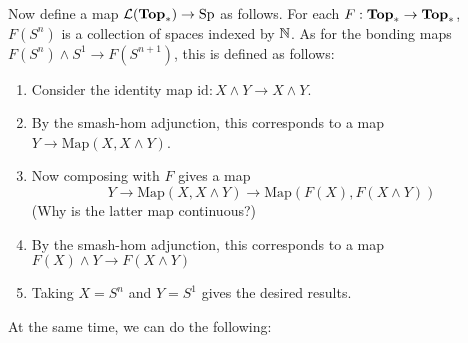 \documentclass[a4paper]{article}
\begin{document}
Now define a map $\mathcal{L}(\bold{Top}_\ast)\to\text{Sp}$ as follows. For each $F:\bold{Top}_\ast\to\bold{Top}_\ast$, $F(S^n)$ is a collection of spaces indexed by $\mathbb{N}$. As for the bonding maps $F(S^n)\wedge S^1\to F(S^{n+1})$, this is defined as follows: 
\begin{enumerate}
\item Consider the identity map $\text{id}:X\wedge Y\to X\wedge Y$. 
\item By the smash-hom adjunction, this corresponds to a map $Y\to\text{Map}(X,X\wedge Y)$. 
\item Now composing with $F$ gives a map $$Y\to\text{Map}(X,X\wedge Y)\to\text{Map}(F(X),F(X\wedge Y))$$ (Why is the latter map continuous?)
\item By the smash-hom adjunction, this corresponds to a map $F(X)\wedge Y\to F(X\wedge Y)$
\item Taking $X=S^n$ and $Y=S^1$ gives the desired results. 
\end{enumerate}

At the same time, we can do the following: 
\end{document}
